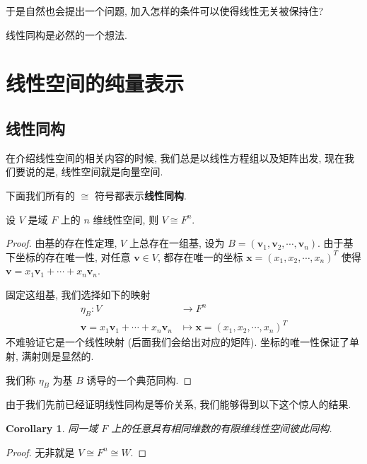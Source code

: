 \documentclass[UTF8]{book}
\newtheorem{corollary}{Corollary}[section]
\begin{document}
于是自然也会提出一个问题, 加入怎样的条件可以使得线性无关被保持住? 

线性同构是必然的一个想法. 


\section{线性空间的纯量表示}

\subsection{线性同构}

在介绍线性空间的相关内容的时候, 我们总是以线性方程组以及矩阵出发, 
现在我们要说的是, 线性空间就是向量空间. 

下面我们所有的 $\cong$ 符号都表示\textbf{线性同构}. 

\begin{theorem}
    设 $V$ 是域 $F$ 上的 $n$ 维线性空间, 则 $V \cong F^n$. 
\end{theorem}

\begin{proof}
    由基的存在性定理, $V$ 上总存在一组基, 设为 
    $B =(\boldsymbol{v}_1,\boldsymbol{v}_2,\cdots,\boldsymbol{v}_n)$. 
    由于基下坐标的存在唯一性, 对任意 $\boldsymbol{v} \in V$, 
    都存在唯一的坐标 $\boldsymbol{x} = (x_1,x_2,\cdots,x_n)^T$ 
    使得 $\boldsymbol{v} = x_1\boldsymbol{v}_1+\cdots+x_n\boldsymbol{v}_n$. 

    固定这组基, 我们选择如下的映射 
    $$\begin{aligned}
        \eta_B: V &\to F^n \\
        \boldsymbol{v} = x_1\boldsymbol{v}_1+\cdots+x_n\boldsymbol{v}_n
        & \mapsto \boldsymbol{x}= (x_1,x_2,\cdots,x_n)^T
    \end{aligned}$$
    不难验证它是一个线性映射 (后面我们会给出对应的矩阵). 
    坐标的唯一性保证了单射, 满射则是显然的. 

    我们称 $\eta_B$ 为基 $B$ 诱导的一个典范同构. 
\end{proof}

由于我们先前已经证明线性同构是等价关系, 我们能够得到以下这个惊人的结果. 

\begin{corollary}
    同一域 $F$ 上的任意具有相同维数的有限维线性空间彼此同构. 
\end{corollary}

\begin{proof}
    无非就是 $V \cong F^n \cong W$. 
\end{proof}
\end{document}
